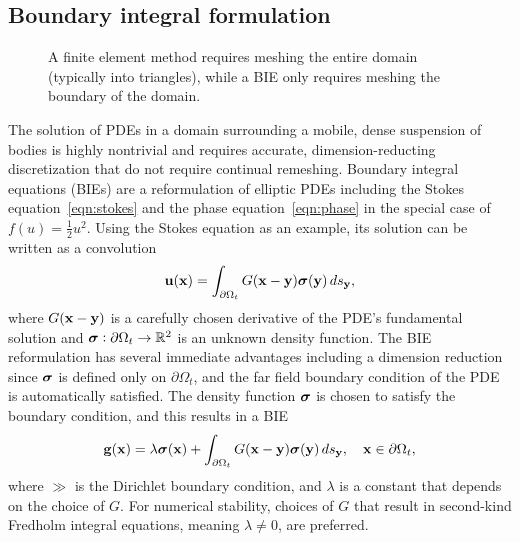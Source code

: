 \subsection{Boundary integral formulation}
\label{sec:bie}
\begin{figure}
  \caption{\label{fig:fem_vs_bie} \footnotesize A finite element method
  requires meshing the entire domain (typically into triangles), while a
  BIE only requires meshing the boundary of the domain.}
\end{figure}
The solution of PDEs in a domain surrounding a mobile, dense suspension
of bodies is highly nontrivial and requires accurate,
dimension-reducting discretization
that do not require continual remeshing.  
Boundary integral equations (BIEs) are a reformulation of elliptic PDEs
including the Stokes equation~\eqref{eqn:stokes} and the phase
equation~\eqref{eqn:phase} in the special case of $f(u) =
\tfrac{1}{2}u^2$. Using the Stokes equation as an example, its solution
can be written as a convolution 
\begin{align*}
  \mathbf{u}(\mathbf{x}) = \int_{\partial\Omega_t} G(\mathbf{x} - \mathbf{y}) \boldsymbol{\sigma}(\mathbf{y}) \, ds_{\mathbf{y}},
\end{align*}
where $G(\mathbf{x} - \mathbf{y})$ is a carefully chosen derivative of the PDE's
fundamental solution and $\boldsymbol{\sigma}: \partial \Omega_t \rightarrow \mathbb{R}^2$
is an unknown density function. The BIE reformulation has several
immediate advantages including a dimension reduction since $\boldsymbol{\sigma}$ is
defined only on $\partial \Omega_t$, and the far field boundary
condition of the PDE is automatically satisfied. The density
function $\boldsymbol{\sigma}$ is chosen to satisfy the boundary condition, and this
results in a BIE 
\begin{align*}
  \mathbf{g}(\mathbf{x}) = \lambda \boldsymbol{\sigma}(\mathbf{x}) + 
    \int_{\partial\Omega_t} G(\mathbf{x} - \mathbf{y}) \boldsymbol{\sigma}(\mathbf{y}) \, ds_{\mathbf{y}},
    \quad \mathbf{x} \in \partial\Omega_t,
\end{align*}
where $\gg$ is the Dirichlet boundary condition, and $\lambda$ is a
constant that depends on the choice of $G$. For numerical stability,
choices of $G$ that result in second-kind Fredholm integral equations,
meaning $\lambda \neq 0$, are preferred.

